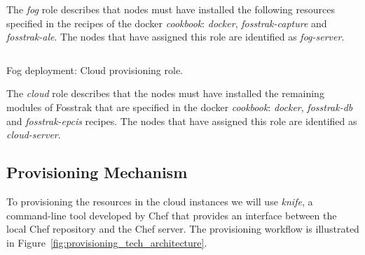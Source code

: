 The \textit{fog} role describes that nodes must have installed the following resources specified in the
recipes of the docker \textit{cookbook}: \textit{docker}, \textit{fosstrak-capture} and
\textit{fosstrak-ale}. The nodes that have assigned this role are identified as \textit{fog-server}.

\begin{listing}[ht!]
  \inputminted[frame=lines,
                 framesep=3mm,
                 linenos=true,
                 xleftmargin=21pt,
                 tabsize=4]{json}{./listings/cloud_role.json}
  \caption{Fog deployment: Cloud provisioning role.}
  \label{listing:fog_cloud_recipe}
\end{listing}

The \textit{cloud} role describes that the nodes must have installed the remaining modules of Fosstrak
that are specified in the docker \textit{cookbook}: \textit{docker}, \textit{fosstrak-db} and
\textit{fosstrak-epcis} recipes. The nodes that have assigned this role are identified as
\textit{cloud-server}.

\subsection{Provisioning Mechanism}
\label{sub:provisioning_mechanism}
To provisioning the resources in the cloud instances we will use \textit{knife}, a command-line tool
developed by Chef that provides an interface between the local Chef repository and the Chef server.
The provisioning workflow is illustrated in Figure~\ref{fig:provisioning_tech_architecture}.\\

